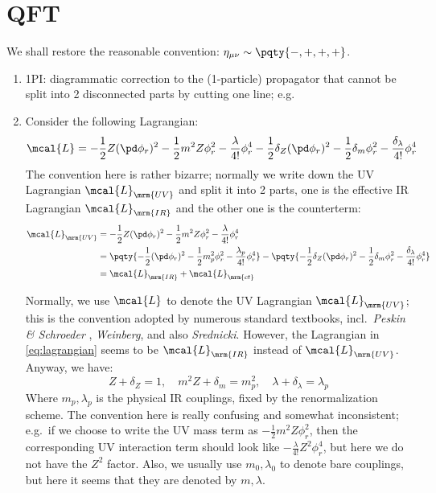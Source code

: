 \documentclass[a4paper
	,10pt
]{article}
\begin{document}
\section{QFT}
We shall restore the reasonable convention: $
	\eta_{\mu\nu}
	\sim \pqty{-,+,+,+}
$. 
\begin{enumerate}
\item 1PI: diagrammatic correction to the (1-particle) propagator that cannot be split into 2 disconnected parts by cutting one line; e.g.\,%
\item Consider the following Lagrangian:
	\begin{equation}
		\mcal{L}
		= -\frac{1}{2} Z(\pd\phi_r)^2
			-\frac{1}{2} m^2 Z\phi_r^2
			-\frac{\lambda}{4!} \phi_r^4
		-\frac{1}{2} \delta_Z(\pd\phi_r)^2
			-\frac{1}{2} \delta_m \phi_r^2
			-\frac{\delta_\lambda}{4!} \phi_r^4
	\label{eq:lagrangian}
	\end{equation}
	The convention here is rather bizarre; normally we write down the UV Lagrangian $\mcal{L}_{\mrm{UV}}$ and split it into 2 parts, one is the effective IR Lagrangian $\mcal{L}_{\mrm{IR}}$ and the other one is the counterterm:
	\begin{equation}
	\begin{aligned}
		\mcal{L}_{\mrm{UV}}
		&= -\frac{1}{2} Z(\pd\phi_r)^2
			-\frac{1}{2} m^2 Z\phi_r^2
			-\frac{\lambda}{4!} \phi_r^4 \\
		&= \pqty{
			-\frac{1}{2} (\pd\phi_r)^2
			-\frac{1}{2} m_p^2 \phi_r^2
			-\frac{\lambda_p}{4!} \phi_r^4
		}
		- \pqty{
			-\frac{1}{2} \delta_Z(\pd\phi_r)^2
			-\frac{1}{2} \delta_m \phi_r^2
			-\frac{\delta_\lambda}{4!} \phi_r^4
		} \\
		&= \mcal{L}_{\mrm{IR}}
			+ \mcal{L}_{\mrm{ct}}
	\end{aligned}
	\end{equation}
	
	Normally, we use $\mcal{L}$ to denote the UV Lagrangian $\mcal{L}_{\mrm{UV}}$; this is the convention adopted by numerous standard textbooks, incl.~\textit{Peskin \& Schroeder} \cite{Peskin:1995ev}, \textit{Weinberg}, and also \textit{Srednicki}. However, the Lagrangian in \eqref{eq:lagrangian} seems to be $\mcal{L}_{\mrm{IR}}$ instead of $\mcal{L}_{\mrm{UV}}$. Anyway, we have:
	\begin{equation}
		Z + \delta_Z = 1,
	\quad
		m^2 Z + \delta_m = m_p^2,
	\quad
		\lambda + \delta_\lambda = \lambda_p
	\end{equation}
	Where $m_p,\lambda_p$ is the physical IR couplings, fixed by the renormalization scheme. The convention here is really confusing and somewhat inconsistent; e.g.\ if we choose to write the UV mass term as $
		-\frac{1}{2} m^2 Z \phi_r^2
	$, then the corresponding UV interaction term should look like $
		-\frac{\lambda}{4!} Z^2 \phi_r^4
	$, but here we do not have the $Z^2$ factor. Also, we usually use $m_0,\lambda_0$ to denote bare couplings, but here it seems that they are denoted by $m,\lambda$.
	

\end{enumerate}
\end{document}
